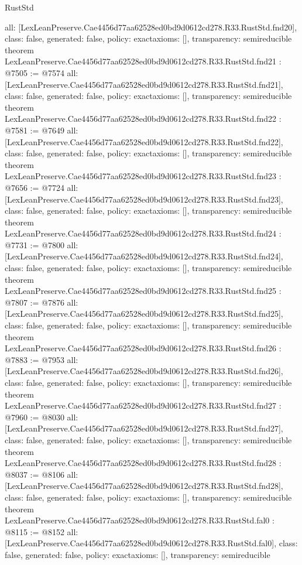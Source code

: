 \begin{lexlean}{RustStd}
\begin{coremodule}
{  all: [LexLeanPreserve.Cae4456d77aa62528ed0bd9d0612cd278.R33.RustStd.fnd20],
  class: false,
  generated: false,
  policy: exact{axioms: []},
  transparency: semireducible
}
theorem LexLeanPreserve.Cae4456d77aa62528ed0bd9d0612cd278.R33.RustStd.fnd21 : @7505 := @7574 {
  all: [LexLeanPreserve.Cae4456d77aa62528ed0bd9d0612cd278.R33.RustStd.fnd21],
  class: false,
  generated: false,
  policy: exact{axioms: []},
  transparency: semireducible
}
theorem LexLeanPreserve.Cae4456d77aa62528ed0bd9d0612cd278.R33.RustStd.fnd22 : @7581 := @7649 {
  all: [LexLeanPreserve.Cae4456d77aa62528ed0bd9d0612cd278.R33.RustStd.fnd22],
  class: false,
  generated: false,
  policy: exact{axioms: []},
  transparency: semireducible
}
theorem LexLeanPreserve.Cae4456d77aa62528ed0bd9d0612cd278.R33.RustStd.fnd23 : @7656 := @7724 {
  all: [LexLeanPreserve.Cae4456d77aa62528ed0bd9d0612cd278.R33.RustStd.fnd23],
  class: false,
  generated: false,
  policy: exact{axioms: []},
  transparency: semireducible
}
theorem LexLeanPreserve.Cae4456d77aa62528ed0bd9d0612cd278.R33.RustStd.fnd24 : @7731 := @7800 {
  all: [LexLeanPreserve.Cae4456d77aa62528ed0bd9d0612cd278.R33.RustStd.fnd24],
  class: false,
  generated: false,
  policy: exact{axioms: []},
  transparency: semireducible
}
theorem LexLeanPreserve.Cae4456d77aa62528ed0bd9d0612cd278.R33.RustStd.fnd25 : @7807 := @7876 {
  all: [LexLeanPreserve.Cae4456d77aa62528ed0bd9d0612cd278.R33.RustStd.fnd25],
  class: false,
  generated: false,
  policy: exact{axioms: []},
  transparency: semireducible
}
theorem LexLeanPreserve.Cae4456d77aa62528ed0bd9d0612cd278.R33.RustStd.fnd26 : @7883 := @7953 {
  all: [LexLeanPreserve.Cae4456d77aa62528ed0bd9d0612cd278.R33.RustStd.fnd26],
  class: false,
  generated: false,
  policy: exact{axioms: []},
  transparency: semireducible
}
theorem LexLeanPreserve.Cae4456d77aa62528ed0bd9d0612cd278.R33.RustStd.fnd27 : @7960 := @8030 {
  all: [LexLeanPreserve.Cae4456d77aa62528ed0bd9d0612cd278.R33.RustStd.fnd27],
  class: false,
  generated: false,
  policy: exact{axioms: []},
  transparency: semireducible
}
theorem LexLeanPreserve.Cae4456d77aa62528ed0bd9d0612cd278.R33.RustStd.fnd28 : @8037 := @8106 {
  all: [LexLeanPreserve.Cae4456d77aa62528ed0bd9d0612cd278.R33.RustStd.fnd28],
  class: false,
  generated: false,
  policy: exact{axioms: []},
  transparency: semireducible
}
theorem LexLeanPreserve.Cae4456d77aa62528ed0bd9d0612cd278.R33.RustStd.fal0 : @8115 := @8152 {
  all: [LexLeanPreserve.Cae4456d77aa62528ed0bd9d0612cd278.R33.RustStd.fal0],
  class: false,
  generated: false,
  policy: exact{axioms: []},
  transparency: semireducible
}
\end{coremodule}
\end{lexlean}
